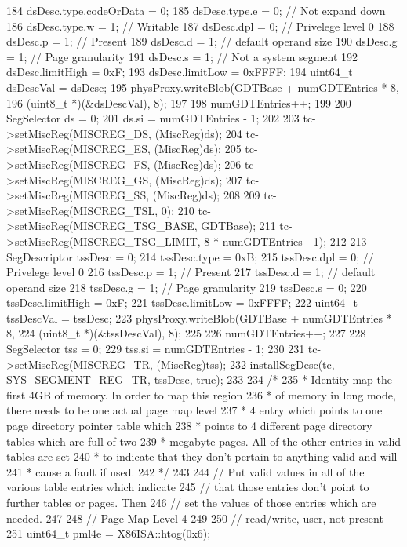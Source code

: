 \begin{DoxyCode}
{184     dsDesc.type.codeOrData = 0;
185     dsDesc.type.e = 0; // Not expand down
186     dsDesc.type.w = 1; // Writable
187     dsDesc.dpl = 0; // Privelege level 0
188     dsDesc.p = 1; // Present
189     dsDesc.d = 1; // default operand size
190     dsDesc.g = 1; // Page granularity
191     dsDesc.s = 1; // Not a system segment
192     dsDesc.limitHigh = 0xF;
193     dsDesc.limitLow = 0xFFFF;
194     uint64_t dsDescVal = dsDesc;
195     physProxy.writeBlob(GDTBase + numGDTEntries * 8,
196                         (uint8_t *)(&dsDescVal), 8);
197 
198     numGDTEntries++;
199 
200     SegSelector ds = 0;
201     ds.si = numGDTEntries - 1;
202 
203     tc->setMiscReg(MISCREG_DS, (MiscReg)ds);
204     tc->setMiscReg(MISCREG_ES, (MiscReg)ds);
205     tc->setMiscReg(MISCREG_FS, (MiscReg)ds);
206     tc->setMiscReg(MISCREG_GS, (MiscReg)ds);
207     tc->setMiscReg(MISCREG_SS, (MiscReg)ds);
208 
209     tc->setMiscReg(MISCREG_TSL, 0);
210     tc->setMiscReg(MISCREG_TSG_BASE, GDTBase);
211     tc->setMiscReg(MISCREG_TSG_LIMIT, 8 * numGDTEntries - 1);
212 
213     SegDescriptor tssDesc = 0;
214     tssDesc.type = 0xB;
215     tssDesc.dpl = 0; // Privelege level 0
216     tssDesc.p = 1; // Present
217     tssDesc.d = 1; // default operand size
218     tssDesc.g = 1; // Page granularity
219     tssDesc.s = 0;
220     tssDesc.limitHigh = 0xF;
221     tssDesc.limitLow = 0xFFFF;
222     uint64_t tssDescVal = tssDesc;
223     physProxy.writeBlob(GDTBase + numGDTEntries * 8,
224                         (uint8_t *)(&tssDescVal), 8);
225 
226     numGDTEntries++;
227 
228     SegSelector tss = 0;
229     tss.si = numGDTEntries - 1;
230 
231     tc->setMiscReg(MISCREG_TR, (MiscReg)tss);
232     installSegDesc(tc, SYS_SEGMENT_REG_TR, tssDesc, true);
233 
234     /*
235      * Identity map the first 4GB of memory. In order to map this region
236      * of memory in long mode, there needs to be one actual page map level
237      * 4 entry which points to one page directory pointer table which
238      * points to 4 different page directory tables which are full of two
239      * megabyte pages. All of the other entries in valid tables are set
240      * to indicate that they don't pertain to anything valid and will
241      * cause a fault if used.
242      */
243 
244     // Put valid values in all of the various table entries which indicate
245     // that those entries don't point to further tables or pages. Then
246     // set the values of those entries which are needed.
247 
248     // Page Map Level 4
249 
250     // read/write, user, not present
251     uint64_t pml4e = X86ISA::htog(0x6);
}
\end{DoxyCode}
